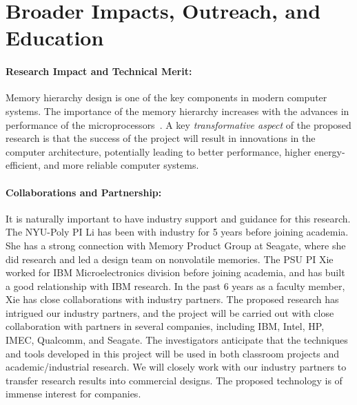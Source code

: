 
\section{Broader Impacts, Outreach, and Education}

\paragraph{\textbf{Research Impact and Technical Merit:}}
Memory hierarchy design is one of the key components in modern computer
systems. The importance of the memory hierarchy
increases with the advances in performance of the
microprocessors~\cite{ITRS07}.  A key \textit{transformative aspect} of the proposed research is
that the success of the project will result in innovations in the computer architecture,
potentially leading to better performance, higher energy-efficient, and more reliable
computer systems.


\paragraph{\textbf{Collaborations and Partnership:}} It is naturally important to have industry support and guidance for this research.  The NYU-Poly PI Li has been with industry for 5 years before joining academia.  She has a strong connection with Memory
Product Group at Seagate, where she did research and led a design team on nonvolatile memories.    The PSU PI Xie worked for IBM Microelectronics division
before joining academia, and has built a good relationship with IBM
research. In the past 6 years as a faculty member, Xie has close collaborations with industry
partners. The proposed research has intrigued our industry partners, and the project will be
carried out with close collaboration with partners in several
companies, including IBM, Intel, HP, IMEC, Qualcomm, and Seagate.
The investigators
anticipate that the techniques and tools developed in this project will be
used in both classroom projects and academic/industrial
research. We will closely work with our industry partners to
transfer research results into commercial designs. The proposed
technology is of immense interest for companies.


